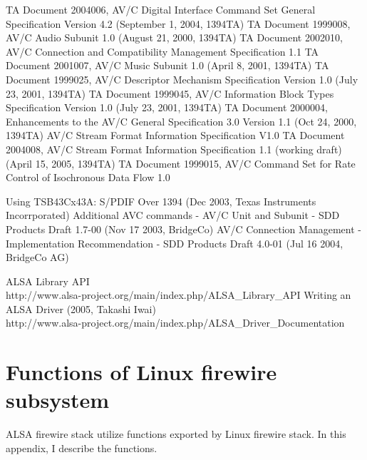 \documentclass[onecolumn]{jarticle}
\begin{document}
\begin{thebibliography}{99}
TA Document 2004006, AV/C Digital Interface Command Set General Specification Version 4.2 (September 1, 2004, 1394TA)
TA Document 1999008, AV/C Audio Subunit 1.0 (August 21, 2000, 1394TA)
TA Document 2002010, AV/C Connection and Compatibility Management Specification 1.1
TA Document 2001007, AV/C Music Subunit 1.0 (April 8, 2001, 1394TA)
TA Document 1999025, AV/C Descriptor Mechanism Specification Version 1.0 (July 23, 2001, 1394TA)
TA Document 1999045, AV/C Information Block Types Specification Version 1.0 (July 23, 2001, 1394TA)
TA Document 2000004, Enhancements to the AV/C General Specification 3.0 Version 1.1 (Oct 24, 2000, 1394TA)
AV/C Stream Format Information Specification V1.0
TA Document 2004008, AV/C Stream Format Information Specification 1.1 (working draft) (April 15, 2005, 1394TA)
TA Document 1999015, AV/C Command Set for Rate Control of Isochronous Data Flow 1.0

Using TSB43Cx43A: S/PDIF Over 1394 (Dec 2003, Texas Instruments Incorrporated)
Additional AVC commands - AV/C Unit and Subunit - SDD Products Draft 1.7-00 (Nov 17 2003, BridgeCo)
AV/C Connection Management - Implementation Recommendation - SDD Products Draft 4.0-01 (Jul 16 2004, BridgeCo AG)

ALSA Library API \\
http://www.alsa-project.org/main/index.php/ALSA\_Library\_API
Writing an ALSA Driver (2005, Takashi Iwai) \\
http://www.alsa-project.org/main/index.php/ALSA\_Driver\_Documentation

\end{thebibliography}

\newpage

\appendix


\section{Functions of Linux firewire subsystem}

ALSA firewire stack utilize functions exported by Linux firewire stack. In this appendix, I describe the functions.
\end{document}
